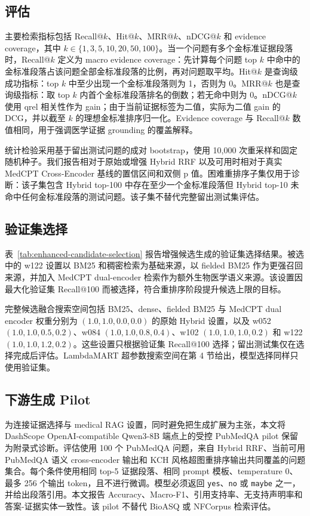 \subsection{评估}

主要检索指标包括 Recall@$k$、Hit@$k$、MRR@$k$、nDCG@$k$ 和 evidence coverage，其中 $k \in \{1,3,5,10,20,50,100\}$。当一个问题有多个金标准证据段落时，Recall@$k$ 定义为 macro evidence coverage：先计算每个问题 top $k$ 中命中的金标准段落占该问题全部金标准段落的比例，再对问题取平均。Hit@$k$ 是查询级成功指标：top $k$ 中至少出现一个金标准段落则为 1，否则为 0。MRR@$k$ 也是查询级指标：取 top $k$ 内首个金标准段落排名的倒数；若无命中则为 0。nDCG@$k$ 使用 qrel 相关性作为 gain；由于当前证据标签为二值，实际为二值 gain 的 DCG，并以截至 $k$ 的理想金标准排序归一化。Evidence coverage 与 Recall@$k$ 数值相同，用于强调医学证据 grounding 的覆盖解释。

统计检验采用基于留出测试问题的成对 bootstrap，使用 10,000 次重采样和固定随机种子。我们报告相对于原始或增强 Hybrid RRF 以及可用时相对于真实 MedCPT Cross-Encoder 基线的置信区间和双侧 p 值。困难重排序子集仅用于诊断：该子集包含 Hybrid top-100 中存在至少一个金标准段落但 Hybrid top-10 未命中任何金标准段落的测试问题。该子集不替代完整留出测试集评估。

\subsection{验证集选择}

表~\ref{tab:enhanced-candidate-selection} 报告增强候选生成的验证集选择结果。被选中的 w122 设置以 BM25 和稠密检索为基础来源，以 fielded BM25 作为更强召回来源，并加入 MedCPT dual-encoder 检索作为额外生物医学语义来源。该设置因最大化验证集 Recall@100 而被选择，符合重排序阶段提升候选上限的目标。

完整候选融合搜索空间包括 BM25、dense、fielded BM25 与 MedCPT dual encoder 权重分别为 $(1.0,1.0,0.0,0.0)$ 的原始 Hybrid 设置，以及 w052 $(1.0,1.0,0.5,0.2)$、w084 $(1.0,1.0,0.8,0.4)$、w102 $(1.0,1.0,1.0,0.2)$ 和 w122 $(1.0,1.0,1.2,0.2)$。这些设置只根据验证集 Recall@100 选择；留出测试集仅在选择完成后评估。LambdaMART 超参数搜索空间在第 4 节给出，模型选择同样只使用验证集。



\subsection{下游生成 Pilot}

为连接证据选择与 medical RAG 设置，同时避免把生成扩展为主张，本文将 DashScope OpenAI-compatible Qwen3-8B 端点上的受控 PubMedQA pilot 保留为附录式诊断。评估使用 100 个 PubMedQA 问题，来自 Hybrid RRF、当前可用 PubMedQA 语义 cross-encoder 输出和 KCH 风格超图重排序输出共同覆盖的问题集合。每个条件使用相同 top-5 证据段落、相同 prompt 模板、temperature 0、最多 256 个输出 token，且不进行微调。模型必须返回 \texttt{yes}、\texttt{no} 或 \texttt{maybe} 之一，并给出段落引用。本文报告 Accuracy、Macro-F1、引用支持率、无支持声明率和答案-证据实体一致性。该 pilot 不替代 BioASQ 或 NFCorpus 检索评估。
